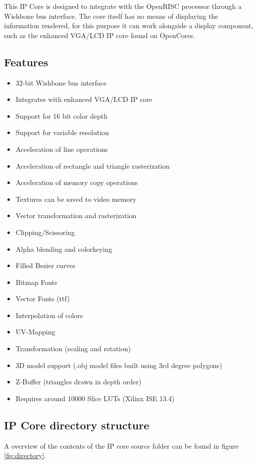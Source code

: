 \documentclass[10pt,a4paper]{article}
\begin{document}
This IP Core is designed to integrate with the OpenRISC processor through a Wishbone bus interface. The core itself has no means of displaying the information rendered, for this purpose it can work alongside a display component, such as the enhanced VGA/LCD IP core found on OpenCores.

\subsection{Features}
\begin{itemize}
\item 32-bit Wishbone bus interface
\item Integrates with enhanced VGA/LCD IP core
\item Support for 16 bit color depth
\item Support for variable resolution
\item Acceleration of line operations
\item Acceleration of rectangle and triangle rasterization
\item Acceleration of memory copy operations
\item Textures can be saved to video memory
\item Vector transformation and rasterization
\item Clipping/Scissoring
\item Alpha blending and colorkeying
\item Filled Bezier curves
\item Bitmap Fonts
\item Vector Fonts (ttf)
\item Interpolation of colors  
\item UV-Mapping
\item Transformation (scaling and rotation)
\item 3D model support (.obj model files built using 3rd degree polygons)
\item Z-Buffer (triangles drawn in depth order)
\item Requires around 10000 Slice LUTs (Xilinx ISE 13.4)
\end{itemize}

\subsection{IP Core directory structure}
A overview of the contents of the IP core source folder can be found in figure \ref{fig:directory}.
\end{document}
